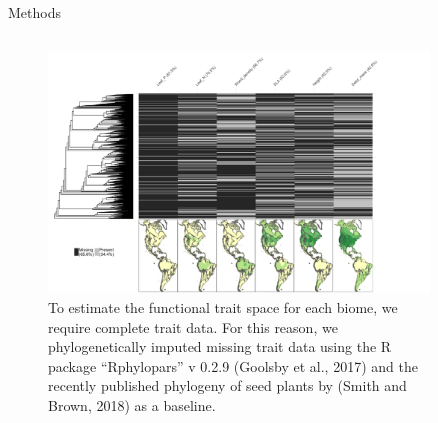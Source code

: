 \documentclass[final]{beamer}
\newlength{\sepwid}
\newlength{\onecolwid}
\newlength{\twocolwid}
\newcommand{\tabitem}{~~\llap{\textbullet}~~}
\def\LW{\dimexpr.2\linewidth-.0em}
\begin{document}
\begin{frame}[t]
\begin{columns}[t]
\begin{column}{\onecolwid}
\begin{block}{Methods}
\begin{tabular}{cp{}cp{}}
\end{tabular}





\begin{figure}[h]
	\centering
	\includegraphics[width=\textwidth]{./figures/Trait_sampling}
	\caption{To estimate the functional trait space for each biome, we require complete trait data. For this reason, we phylogenetically imputed missing trait data using the R package ``Rphylopars'' v 0.2.9 (Goolsby et al., 2017) and the recently published phylogeny of seed plants by (Smith and Brown, 2018) as a baseline. }
	\label{fig:sampling}
\end{figure}








	\end{block}

    \end{column}


    \begin{column}{\sepwid}\end{column}			%
    \begin{column}{\twocolwid}							%


\end{column}
\end{columns}
\end{frame}
\end{document}
